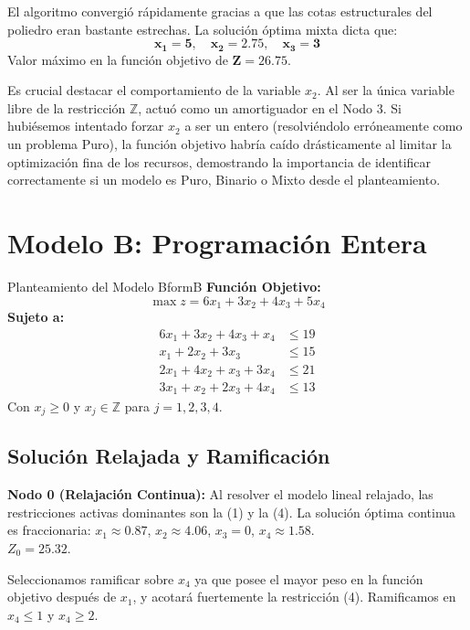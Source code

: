 \documentclass[10pt,a4paper]{article}
\begin{document}
El algoritmo convergió rápidamente gracias a que las cotas estructurales del poliedro eran bastante estrechas. La solución óptima mixta dicta que:
\[ \mathbf{x_1 = 5, \quad x_2 = 2.75, \quad x_3 = 3} \]
Valor máximo en la función objetivo de $\mathbf{Z = 26.75}$. 

Es crucial destacar el comportamiento de la variable $x_2$. Al ser la única variable libre de la restricción $\mathbb{Z}$, actuó como un amortiguador en el Nodo 3. Si hubiésemos intentado forzar $x_2$ a ser un entero (resolviéndolo erróneamente como un problema Puro), la función objetivo habría caído drásticamente al limitar la optimización fina de los recursos, demostrando la importancia de identificar correctamente si un modelo es Puro, Binario o Mixto desde el planteamiento.

\newpage

\section{Modelo B: Programación Entera}

\begin{ejercicio}{Planteamiento del Modelo B}{formB}
\textbf{Función Objetivo:}
\[ \max z = 6x_1 + 3x_2 + 4x_3 + 5x_4 \]
\textbf{Sujeto a:}
\begin{align}
    6x_1 + 3x_2 + 4x_3 + x_4 &\leq 19 \\
    x_1 + 2x_2 + 3x_3 &\leq 15 \\
    2x_1 + 4x_2 + x_3 + 3x_4 &\leq 21 \\
    3x_1 + x_2 + 2x_3 + 4x_4 &\leq 13 
\end{align}
Con $x_j \geq 0$ y $x_j \in \mathbb{Z}$ para $j = 1,2,3,4$.
\end{ejercicio}

\subsection{Solución Relajada y Ramificación}

\textbf{Nodo 0 (Relajación Continua):}
Al resolver el modelo lineal relajado, las restricciones activas dominantes son la (1) y la (4). La solución óptima continua es fraccionaria:
$x_1 \approx 0.87$, $x_2 \approx 4.06$, $x_3 = 0$, $x_4 \approx 1.58$. \\
$Z_0 = 25.32$.

Seleccionamos ramificar sobre $x_4$ ya que posee el mayor peso en la función objetivo después de $x_1$, y acotará fuertemente la restricción (4). Ramificamos en $x_4 \leq 1$ y $x_4 \geq 2$.
\end{document}
